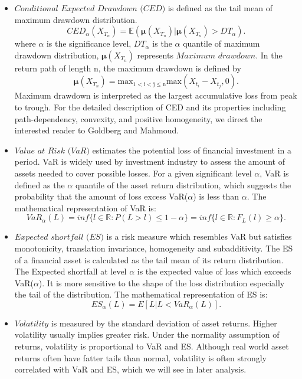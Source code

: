 \documentclass[11pt]{article}
\begin{document}
\begin{itemize}
\item $\textit{Conditional Expected Drawdown (CED)}$ is defined as the tail mean of maximum drawdown distribution.
\begin{equation}
CED_\alpha(X_{T_n}) = \mathbb{E}(\boldsymbol{\mu}(X_{T_n})|\boldsymbol{\mu}(X_{T_n}) > DT_\alpha).
\end{equation}
where $\alpha$ is the significance level, $DT_\alpha$ is the $\alpha$ quantile of maximum drawdown distribution, $\boldsymbol{\mu}(X_{T_n})$ represents $\textit{Maximum drawdown}$. In the return path of length n, the maximum drawdown is defined by
\begin{equation}
\boldsymbol{\mu}(X_{T_n}) = \mathrm{max_{1 < i < j \leq n} max}({X_{t_i}-X_{t_j}, 0}).
\end{equation}
Maximum drawdown is interpreted as the largest accumulative loss from peak to trough. For the detailed description of CED and its properties including path-dependency, convexity, and positive homogeneity, we direct the interested reader to Goldberg and Mahmoud\cite{goldberg2014convex}.


\item $\textit{Value at Risk (VaR)} $ estimates the potential loss of financial investment in a period. VaR is widely used by investment industry to assess the amount of assets needed to cover possible losses. For a given significant level $\alpha$, VaR is defined as the $\alpha$ quantile of the asset return distribution, which suggests the probability that the amount of loss excess VaR($\alpha$) is less than $\alpha$. The mathematical representation of VaR is: 
\begin{equation}
VaR_{\alpha}(L) = inf\{l \in \mathbb{R} : P(L > l) \leq 1-\alpha \} = 
inf\{l \in \mathbb{R} : F_L(l) \geq \alpha \}.
\end{equation}

\item $\textit{Expected shortfall (ES)}$ is a risk measure which resembles VaR but satisfies monotonicity, translation invariance, homogeneity and subadditivity. The ES of a financial asset is calculated as the tail mean of its return distribution. The Expected shortfall at level $\alpha$ is the expected value of loss which exceeds VaR($\alpha$). It is more sensitive to the shape of the loss distribution especially the tail of the distribution. The mathematical representation of ES is:
\begin{equation}
ES_{\alpha}(L) = E\left[ L \vert L<VaR_{\alpha}(L) \right].
\end{equation}

\item $\textit{Volatility}$ is measured by the standard deviation of asset returns. Higher volatility usually implies greater risk. Under the normality assumption of returns, volatility is proportional to VaR and ES. Although real world asset returns often have fatter tails than normal, volatility is often strongly correlated with VaR and ES, which we will see in later analysis. 

\end{itemize}
\end{document}
